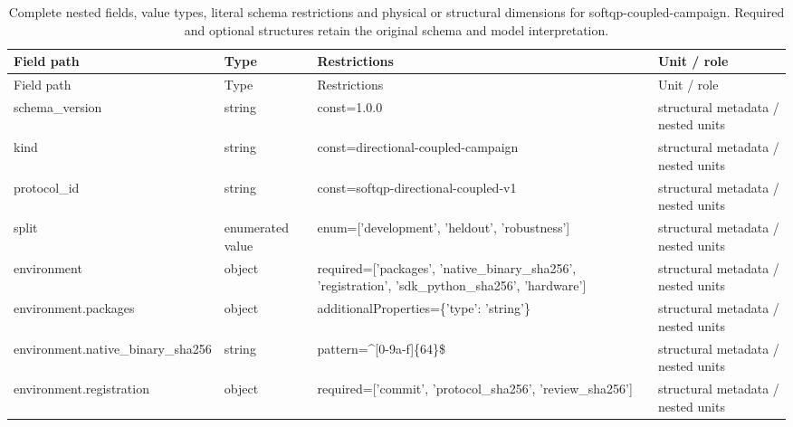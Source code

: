 \begingroup\footnotesize\setlength{\tabcolsep}{3pt}
\begin{longtable}{@{}>{\raggedright\arraybackslash}p{}>{\raggedright\arraybackslash}p{}>{\raggedright\arraybackslash}p{}>{\raggedright\arraybackslash}p{}@{}}
\caption{Complete nested fields, value types, literal schema restrictions and physical or structural dimensions for softqp-coupled-campaign. Required and optional structures retain the original schema and model interpretation.}\label{tab:nested-softqp-coupled-campaign}\\ %
\toprule Field path & Type & Restrictions & Unit / role\\\midrule\endfirsthead
\toprule Field path & Type & Restrictions & Unit / role\\\midrule\endhead
\bottomrule\endfoot
schema\_\allowbreak{}version & string & const=\allowbreak{}1.\allowbreak{}0.\allowbreak{}0 & structural metadata /\allowbreak{} nested units\\
kind & string & const=\allowbreak{}directional-\allowbreak{}coupled-\allowbreak{}campaign & structural metadata /\allowbreak{} nested units\\ %
protocol\_\allowbreak{}id & string & const=\allowbreak{}softqp-\allowbreak{}directional-\allowbreak{}coupled-\allowbreak{}v1 & structural metadata /\allowbreak{} nested units\\
split & enumerated value & enum=\allowbreak{}['development', 'heldout', 'robustness'] & structural metadata /\allowbreak{} nested units\\
environment & object & required=\allowbreak{}['packages', 'native\_\allowbreak{}binary\_\allowbreak{}sha256', 'registration', 'sdk\_\allowbreak{}python\_\allowbreak{}sha256', 'hardware'] & structural metadata /\allowbreak{} nested units\\
environment.\allowbreak{}packages & object & additionalProperties=\allowbreak{}\{'type': 'string'\} & structural metadata /\allowbreak{} nested units\\
environment.\allowbreak{}native\_\allowbreak{}binary\_\allowbreak{}sha256 & string & pattern=\allowbreak{}\textasciicircum{}[0-9a-\allowbreak{}f]\{64\}\$ & structural metadata /\allowbreak{} nested units\\
environment.\allowbreak{}registration & object & required=\allowbreak{}['commit', 'protocol\_\allowbreak{}sha256', 'review\_\allowbreak{}sha256'] & structural metadata /\allowbreak{} nested units\\

\end{longtable}

